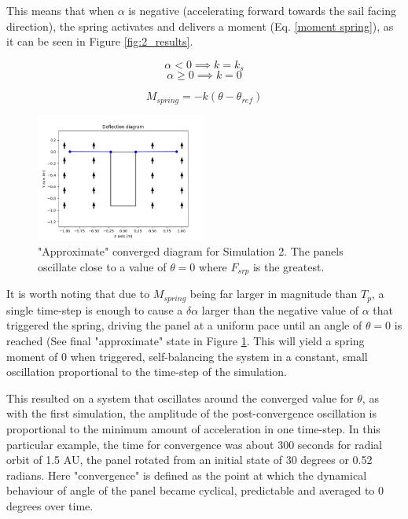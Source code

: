This means that when $\alpha$ is negative (accelerating forward towards the sail facing direction), the spring activates and delivers a moment (Eq. \ref{moment spring}), as it can be seen in Figure \ref{fig:2_results}.

   $$\alpha < 0 \implies k = k_{s}  $$
    $$\alpha \geq 0 \implies k = 0$$


\begin{equation}
    M_{spring} = -k(\theta - \theta_{ref}) \label{moment spring}
\end{equation}

\begin{figure}[!htb]
\centering
\includegraphics[width=0.5\textwidth]{images/second/deflection_diagram.png}
\caption{"Approximate" converged diagram for Simulation 2. The panels oscillate close to a value of $\theta = 0$ where $F_{srp}$ is the greatest.}
\label{fig:2_diagram}
\end{figure}


It is worth noting that due to $M_{spring}$ being far larger in magnitude than $T_{p}$, a single time-step is enough to cause a $\delta\alpha$ larger than the negative value of $\alpha$ that triggered the spring, driving the panel at a uniform pace until an angle of $\theta = 0$ is reached (See final "approximate" state in Figure \ref{fig:2_diagram}. This will yield a spring moment of 0 when triggered, self-balancing the system in a constant, small oscillation proportional to the time-step of the simulation.

This resulted on a system that oscillates around the converged value for $\theta$, as with the first simulation, the amplitude of the post-convergence oscillation is proportional to the minimum amount of acceleration in one time-step. In this particular example, the time for convergence was about 300 seconds for radial orbit of 1.5 AU, the panel rotated from an initial state of 30 degrees or 0.52 radians. Here "convergence" is defined as the point at which the dynamical behaviour of angle of the panel became cyclical, predictable and averaged to 0 degrees over time.

